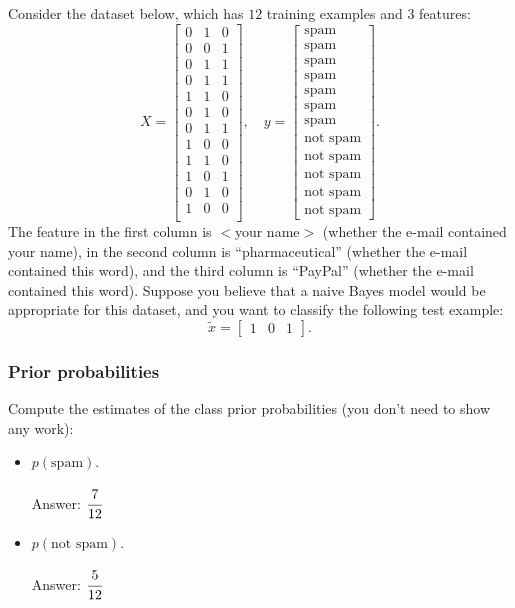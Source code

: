 \documentclass{article}
\def\ans#1{\par\gre{Answer: #1}}
\def\blu#1{{\color{blu}#1}}
\def\gre#1{{\color{gre}#1}}
\def\items#1{\begin{itemize}#1\end{itemize}}
\begin{document}
Consider the dataset below, which has $12$ training examples and $3$ features:
\[
X = \begin{bmatrix}0 & 1 & 0\\0 & 0 & 1\\0 & 1 & 1\\ 0 & 1 & 1\\ 1 & 1 & 0\\0 & 1 & 0\\0 & 1 & 1\\1 & 0 & 0\\1 & 1 & 0\\1 & 0 & 1\\0 & 1 & 0\\1 & 0 & 0\\\end{bmatrix}, \quad y = \begin{bmatrix}\text{spam}\\\text{spam}\\\text{spam}\\\text{spam}\\\text{spam}\\\text{spam}\\\text{spam}\\\text{not spam}\\\text{not spam}\\\text{not spam}\\\text{not spam}\\\text{not spam}\end{bmatrix}.
\]
The feature in the first column is $<$your name$>$ (whether the e-mail contained your name), in the second column is ``pharmaceutical'' (whether the e-mail contained this word), and the third column is ``PayPal'' (whether the e-mail contained this word).
Suppose you believe that a naive Bayes model would be appropriate for this dataset, and you want to classify the following test example:
\[
\tilde{x} = \begin{bmatrix}1 & 0 & 1\end{bmatrix}.
\]

\pagebreak

\subsubsection{Prior probabilities}

\blu{Compute the estimates of the class prior probabilities} (you don't need to show any work):
\items{
\item$ p(\text{spam})$. \ans {$\cfrac{7}{12}$}
\item $p(\text{not spam})$. \ans {$\cfrac{5}{12}$}
}
\end{document}
